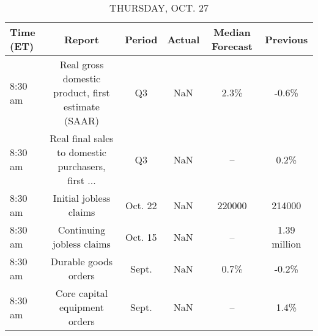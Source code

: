 \documentclass{article}%
\begin{document}
%


\begin{table}[htbp]%
\caption{THURSDAY, OCT. 27}%
\centering%
\begin{adjustbox}{width=1\textwidth}%
\begin{tabular}{lccccc}
\toprule
Time (ET) &                                             Report &  Period & Actual & Median Forecast &     Previous \\
\midrule
  8:30 am & Real gross domestic product, first estimate (SAAR) &      Q3 &    NaN &            2.3\% &        -0.6\% \\
  8:30 am & Real final sales to domestic purchasers, first ... &      Q3 &    NaN &              -- &         0.2\% \\
  8:30 am &                             Initial jobless claims & Oct. 22 &    NaN &          220000 &       214000 \\
  8:30 am &                          Continuing jobless claims & Oct. 15 &    NaN &              -- & 1.39 million \\
  8:30 am &                               Durable goods orders &   Sept. &    NaN &            0.7\% &        -0.2\% \\
  8:30 am &                      Core capital equipment orders &   Sept. &    NaN &              -- &         1.4\% \\
\bottomrule
\end{tabular}
%
\end{adjustbox}%
\end{table}

%
\end{document}

